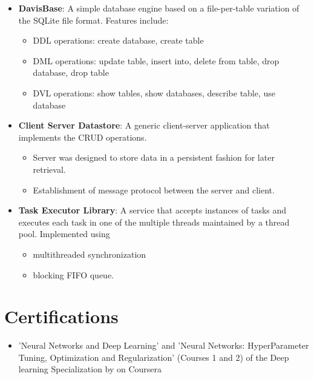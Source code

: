 \documentclass[letterpaper,11pt]{article}
\begin{document}
\begin{itemize}[noitemsep,nolistsep,leftmargin=*]
\item \textbf{DavisBase}: A simple database engine based on a file-per-table variation of the SQLite file format. Features include:
 \begin{itemize}[noitemsep,nolistsep,leftmargin=*]
\item DDL operations: create database, create table 
 \item DML operations: update table, insert into, delete from table, drop database, drop table
 \item DVL operations: show tables, show databases, describe table, use database
      \end{itemize}
\item \textbf{Client Server Datastore}: A generic client-server application that implements the CRUD operations.  
 \begin{itemize}[noitemsep,nolistsep,leftmargin=*]
 \item Server was designed to store data in a persistent fashion for later retrieval. \item Establishment of message protocol between the server and client.
 \end{itemize}

\item \textbf{Task Executor Library}: A service that accepts instances of tasks and executes each task in one of the multiple threads maintained by a thread pool. Implemented using
 \begin{itemize}[noitemsep,nolistsep,leftmargin=*]
\item multithreaded synchronization 
\item blocking FIFO queue.
 \end{itemize}
     

\end{itemize}
 
      

\section{Certifications}
\begin{itemize}[noitemsep,nolistsep,leftmargin=*]



   \item  'Neural Networks and Deep Learning' and  
 'Neural Networks: HyperParameter Tuning, Optimization and Regularization' (Courses 1 and 2) of the Deep learning Specialization by { }  on Coursera\\

 
 \end{itemize}
 

 
 
 
\end{document}
